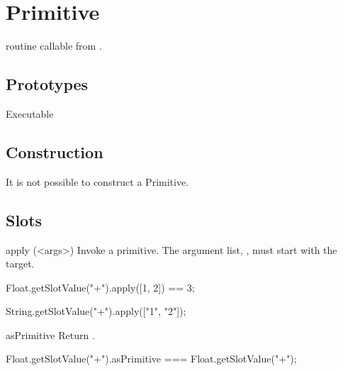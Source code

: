 
\section{Primitive}
\Cxx routine callable from \us.

\subsection{Prototypes}
\begin{refObjects}
\item[Executable]
\end{refObjects}

\subsection{Construction}

It is not possible to construct a Primitive.

\subsection{Slots}

\begin{urbiscriptapi}
\item[apply](<args>)%
  Invoke a primitive.  The argument list, , must start with
  the target.
\begin{urbiassert}
Float.getSlotValue("+").apply([1, 2]) == 3;

String.getSlotValue("+").apply(["1", "2"]);
\end{urbiassert}


\item[asPrimitive] Return \this.
\begin{urbiassert}
Float.getSlotValue("+").asPrimitive === Float.getSlotValue("+");
\end{urbiassert}
\end{urbiscriptapi}


